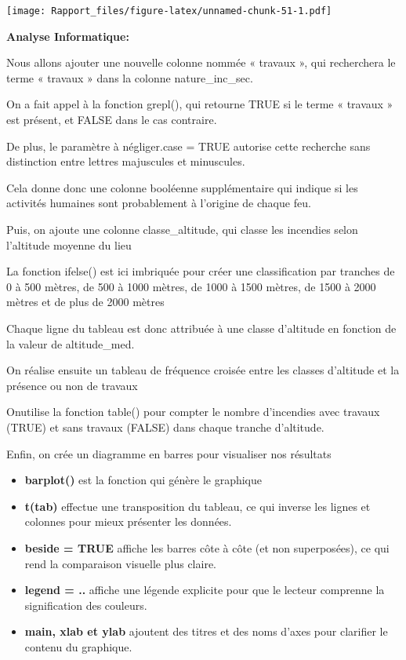 \documentclass[
]{article}
\providecommand{\tightlist}{%
  \setlength{\itemsep}{0pt}\setlength{\parskip}{0pt}}
\begin{document}
\texttt{[image: Rapport\_files/figure-latex/unnamed-chunk-51-1.pdf]}

\textbf{Analyse Informatique:}

Nous allons ajouter une nouvelle colonne nommée « travaux », qui
recherchera le terme « travaux » dans la colonne nature\_inc\_sec.~

On a fait appel à la fonction grepl(), qui retourne TRUE si le terme «
travaux » est présent, et FALSE dans le cas contraire.

De plus, le paramètre à négliger.case = TRUE autorise cette recherche
sans distinction entre lettres majuscules et minuscules.

Cela donne donc une colonne booléenne supplémentaire qui indique si les
activités humaines sont probablement à l'origine de chaque feu.

Puis, on ajoute une colonne classe\_altitude, qui classe les incendies
selon l'altitude moyenne du lieu

La fonction ifelse() est ici imbriquée pour créer une classification par
tranches de 0 à 500 mètres, de 500 à 1000 mètres, de 1000 à 1500 mètres,
de 1500 à 2000 mètres et de plus de 2000 mètres

Chaque ligne du tableau est donc attribuée à une classe d'altitude en
fonction de la valeur de altitude\_med.

On réalise ensuite un tableau de fréquence croisée entre les classes
d'altitude et la présence ou non de travaux

Onutilise la fonction table() pour compter le nombre d'incendies avec
travaux (TRUE) et sans travaux (FALSE) dans chaque tranche d'altitude.

Enfin, on crée un diagramme en barres pour visualiser nos résultats

\begin{itemize}
\tightlist
\item
  \textbf{barplot()} est la fonction qui génère le graphique
\item
  \textbf{t(tab)} effectue une transposition du tableau, ce qui inverse
  les lignes et colonnes pour mieux présenter les données.
\item
  \textbf{beside = TRUE} affiche les barres côte à côte (et non
  superposées), ce qui rend la comparaison visuelle plus claire.
\item
  \textbf{legend = ..} affiche une légende explicite pour que le lecteur
  comprenne la signification des couleurs.
\item
  \textbf{main, xlab et ylab} ajoutent des titres et des noms d'axes
  pour clarifier le contenu du graphique.
\end{itemize}
\end{document}
